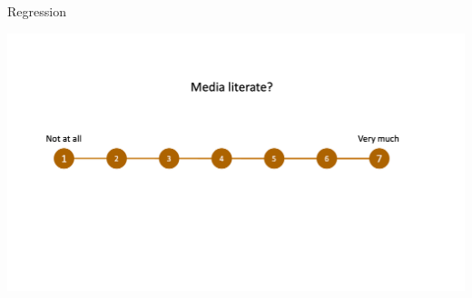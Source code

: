 \documentclass[handout]{beamer}
\begin{document}
\begin{frame}{Regression}
	
	\begin{center}
		\includegraphics[width=\linewidth,height=\textheight,keepaspectratio]{../pictures/medialiteracyscale.png} \\\
	\end{center}
	
	
	
	
	
	
\end{frame}
\end{document}
